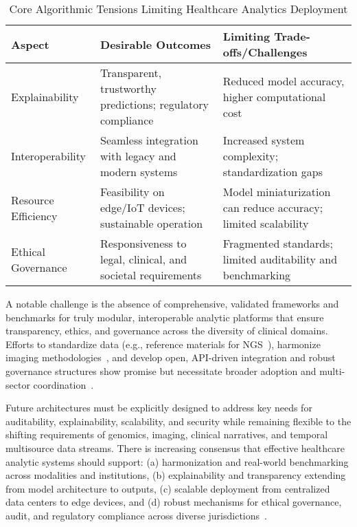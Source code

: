 \documentclass[sigconf]{acmart}
\begin{document}
\begin{table*}[htbp]
\centering
\caption{Core Algorithmic Tensions Limiting Healthcare Analytics Deployment}
\label{tab:algorithmic_tensions}
\begin{adjustbox}{max width=\textwidth}
\begin{tabular}{lll}
\toprule
\textbf{Aspect} & \textbf{Desirable Outcomes} & \textbf{Limiting Trade-offs/Challenges} \\
\midrule
Explainability & Transparent, trustworthy predictions; regulatory compliance & Reduced model accuracy, higher computational cost\\
Interoperability & Seamless integration with legacy and modern systems & Increased system complexity; standardization gaps\\
Resource Efficiency & Feasibility on edge/IoT devices; sustainable operation & Model miniaturization can reduce accuracy; limited scalability \\
Ethical Governance & Responsiveness to legal, clinical, and societal requirements & Fragmented standards; limited auditability and benchmarking\\
\bottomrule
\end{tabular}
\end{adjustbox}
\end{table*}

A notable challenge is the absence of comprehensive, validated frameworks and benchmarks for truly modular, interoperable analytic platforms that ensure transparency, ethics, and governance across the diversity of clinical domains. Efforts to standardize data (e.g., reference materials for NGS~\cite{ref61}), harmonize imaging methodologies~\cite{ref44,ref45}, and develop open, API-driven integration and robust governance structures show promise but necessitate broader adoption and multi-sector coordination~\cite{ref7, ref24, ref30, ref44, ref45, ref46, ref49, ref50, ref61, ref63, ref64, ref65, ref70, ref71, ref72, ref73, ref74, ref75, ref76, ref77, ref78, ref80, ref84, ref106, ref107}.

Future architectures must be explicitly designed to address key needs for auditability, explainability, scalability, and security while remaining flexible to the shifting requirements of genomics, imaging, clinical narratives, and temporal multisource data streams. There is increasing consensus that effective healthcare analytic systems should support: (a) harmonization and real-world benchmarking across modalities and institutions, (b) explainability and transparency extending from model architecture to outputs, (c) scalable deployment from centralized data centers to edge devices, and (d) robust mechanisms for ethical governance, audit, and regulatory compliance across diverse jurisdictions~\cite{ref37,ref46,ref50,ref65,ref70,ref78,ref84}.
\end{document}
